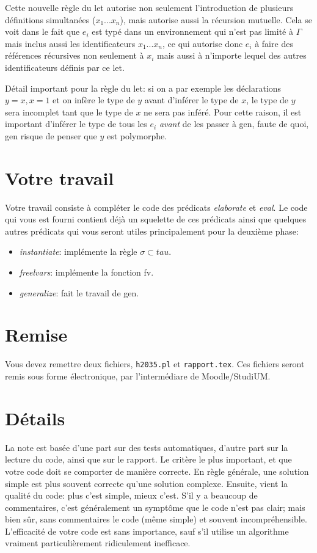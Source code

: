 \documentclass{article}
\newcommand \kw [1] {\textsf{#1}}
\newcommand \id [1] {\textsl{#1}}
\renewcommand \: {\!:\!}
\begin{document}
Cette nouvelle règle du \kw{let} autorise non seulement l'introduction de
plusieurs définitions simultanées ($x_1...x_n$), mais autorise aussi la
récursion mutuelle.  Cela se voit dans le fait que $e_i$ est typé dans un
environnement qui n'est pas limité à $\Gamma$ mais inclus aussi les
identificateurs $x_1...x_n$, ce qui autorise donc $e_i$ à faire des
références récursives non seulement à $x_i$ mais aussi à n'importe lequel
des autres identificateurs définis par ce \kw{let}.

Détail important pour la règle du \kw{let}: si on a par exemple les
déclarations $y = x, x = 1$ et on infère le type de $y$ avant d'inférer
le type de $x$, le type de $y$ sera incomplet tant que le type de $x$ ne
sera pas inféré.  Pour cette raison, il est important d'inférer le type de
tous les $e_i$ \emph{avant} de les passer à \kw{gen}, faute de quoi,
\kw{gen} risque de penser que $y$ est polymorphe.

\section{Votre travail}

Votre travail consiste à compléter le code des prédicats \id{elaborate} et
\id{eval}.  Le code qui vous est fourni contient déjà un squelette de ces
prédicats ainsi que quelques autres prédicats qui vous seront utiles
principalement pour la deuxième phase:
\begin{itemize}
\item \id{instantiate}: implémente la règle $\sigma \subset tau$.
\item \id{freelvars}: implémente la fonction \kw{fv}.
\item \id{generalize}: fait le travail de \kw{gen}.
\end{itemize}

\section{Remise}

Vous devez remettre deux fichiers, \texttt{h2035.pl} et
\texttt{rapport.tex}.  Ces fichiers seront remis sous forme électronique,
par l'intermédiare de Moodle/StudiUM.

\section{Détails}

La note est basée d'une part sur des tests automatiques, d'autre part sur la
lecture du code, ainsi que sur le rapport.  Le critère le plus important, et
que votre code doit se comporter de manière correcte.  En règle générale,
une solution simple est plus souvent correcte qu'une solution complexe.
Ensuite, vient la qualité du code: plus c'est simple, mieux c'est.
S'il y a beaucoup de commentaires, c'est généralement un symptôme que le
code n'est pas clair; mais bien sûr, sans commentaires le code (même simple)
et souvent incompréhensible.  L'efficacité de votre code est sans
importance, sauf s'il utilise un algorithme vraiment particulièrement
ridiculement inefficace.
\end{document}
